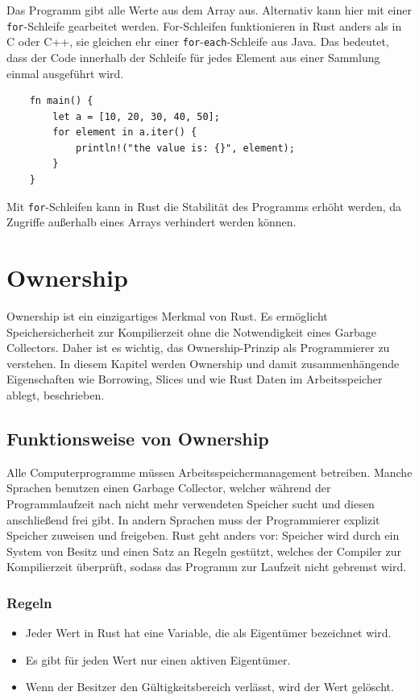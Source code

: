 Das Programm gibt alle Werte aus dem Array aus. Alternativ kann hier mit einer \verb"for"-Schleife gearbeitet werden. For-Schleifen funktionieren in Rust anders als in C oder C++, sie gleichen ehr einer \verb"for"-\verb"each"-Schleife aus Java. Das bedeutet, dass der Code innerhalb der Schleife für jedes Element aus einer Sammlung einmal ausgeführt wird.

\begin{lstlisting}
    fn main() {
        let a = [10, 20, 30, 40, 50];
        for element in a.iter() {
            println!("the value is: {}", element);
        }
    }
\end{lstlisting}

Mit \verb"for"-Schleifen kann in Rust die Stabilität des Programms erhöht werden, da Zugriffe außerhalb eines Arrays verhindert werden können.


\section{Ownership}

Ownership ist ein einzigartiges Merkmal von Rust. Es ermöglicht Speichersicherheit zur Kompilierzeit ohne die Notwendigkeit eines Garbage Collectors. Daher ist es wichtig, das Ownership-Prinzip als Programmierer zu verstehen. In diesem Kapitel werden Ownership und damit zusammenhängende Eigenschaften wie Borrowing, Slices und wie Rust Daten im Arbeitsspeicher ablegt, beschrieben.

\subsection{Funktionsweise von Ownership}

Alle Computerprogramme müssen Arbeitsspeichermanagement betreiben. Man\-che Sprachen benutzen einen Garbage Collector, welcher während der Programmlaufzeit nach nicht mehr verwendeten Speicher sucht und diesen anschließend frei gibt. In andern Sprachen muss der Programmierer explizit Speicher zuweisen und freigeben. Rust geht anders vor: Speicher wird durch ein System von Besitz und einen Satz an Regeln gestützt, welches der Compiler zur Kompilierzeit überprüft, sodass das Programm zur Laufzeit nicht gebremst wird.

\subsubsection{Regeln}

\begin{itemize}
    \item Jeder Wert in Rust hat eine Variable, die als Eigentümer bezeichnet wird.
    \item Es gibt für jeden Wert nur einen aktiven Eigentümer.
    \item Wenn der Besitzer den Gültigkeitsbereich verlässt, wird der Wert gelöscht.
\end{itemize}

